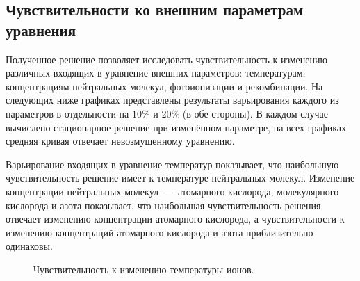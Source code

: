 \documentclass[14pt, a4paper, fleqn]{extarticle}
\begin{document}
\subsection{Чувствительности ко внешним параметрам уравнения}



Полученное решение позволяет исследовать чувствительность к изменению различных входящих в уравнение внешних параметров: температурам, концентрациям нейтральных молекул, фотоионизации и рекомбинации. На следующих ниже графиках представлены результаты варьирования каждого из параметров в отдельности на $10\%$ и $20\%$ (в обе стороны). В каждом случае вычислено стационарное решение при изменённом параметре, на всех графиках средняя кривая отвечает невозмущенному уравнению.

\medskip

Варьирование входящих в уравнение температур показывает, что наибольшую чувствительность решение имеет к температуре нейтральных молекул. Изменение концентрации нейтральных молекул~---~атомарного кислорода, молекулярного кислорода и азота показывает, что наибольшая чувствительность решения отвечает изменению концентрации атомарного кислорода, а чувствительности к изменению концентраций атомарного кислорода и азота приблизительно одинаковы.

\medskip

\begin{figure}
\caption{Чувствительность к изменению температуры ионов.}
\end{figure}
\end{document}
